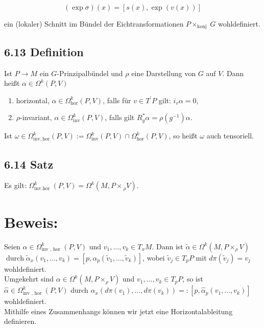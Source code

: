 $$
(\exp \sigma)(x)=[s(x), \exp (v(x))]
$$

ein (lokaler) Schnitt im Bündel der Eichtransformationen $P \times_{\text {konj }} G$ wohldefiniert.

\subsection*{6.13 Definition}
Ist $P \rightarrow M$ ein $G$-Prinzipalbündel und $\rho$ eine Darstellung von $G$ auf $V$. Dann heißt $\alpha \in \Omega^{k}(P, V)$

\begin{enumerate}
  \item horizontal, $\alpha \in \Omega_{\mathrm{hor}}^{k}(P, V)$, falls für $v \in T^{\prime} P$ gilt: $i_{v} \alpha=0$,
  \item $\rho$-invariant, $\alpha \in \Omega_{\mathrm{inv}}^{k}(P, V)$, falls gilt $R_{g}^{*} \alpha=\rho\left(g^{-1}\right) \alpha$.
\end{enumerate}

Ist $\omega \in \Omega_{\mathrm{inv}, \mathrm{hor}}^{k}(P, V):=\Omega_{\mathrm{inv}}^{k}(P, V) \cap \Omega_{\mathrm{hor}}^{k}(P, V)$, so heißt $\omega$ auch tensoriell.

\subsection*{6.14 Satz}
Es gilt: $\Omega_{\text {inv.hor }}^{k}(P, V)=\Omega^{k}\left(M, P \times{ }_{\rho} V\right)$.

\section*{Beweis:}
Seien $\alpha \in \Omega_{\text {inv }, \text { hor }}^{k}(P, V)$ und $v_{1}, \ldots, v_{k} \in T_{x} M$. Dann ist $\tilde{\alpha} \in \Omega^{k}\left(M, P \times_{\rho} V\right)$ $\operatorname{durch} \tilde{\alpha}_{x}\left(v_{1}, \ldots, v_{k}\right)=\left[p, \alpha_{p}\left(\tilde{v}_{1}, \ldots, \tilde{v}_{k}\right)\right]$, wobei $\tilde{v}_{j} \in T_{p} P$ mit $d \pi\left(\tilde{v}_{j}\right)=v_{j}$ wohldefiniert.\\
Umgekehrt sind $\alpha \in \Omega^{k}\left(M, P \times_{\rho} V\right)$ und $v_{1}, \ldots, v_{k} \in T_{p} P$, so ist $\hat{\alpha} \in \Omega_{\text {inv }, \text { hor }}^{k}(P, V)$ durch $\alpha_{x}\left(d \pi\left(v_{1}\right), \ldots, d \pi\left(v_{k}\right)\right)=:\left[p, \hat{\alpha}_{p}\left(v_{1}, \ldots, v_{k}\right)\right]$ wohldefiniert.\\
Mithilfe eines Zusammenhangs können wir jetzt eine Horizontalableitung definieren.

